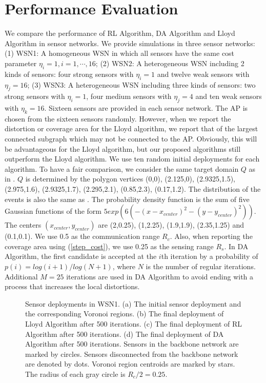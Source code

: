 \documentclass[journal,draftcls,onecolumn,12pt,twoside, narroweqnarray]{IEEEtran}
\begin{document}
\section{Performance Evaluation}
We compare the performance of RL Algorithm, DA Algorithm and Lloyd Algorithm in sensor networks. We provide simulations in three sensor networks: (1) WSN1: A homogeneous WSN in which all sensors have the same cost parameter $\eta_i=1, i=1,\cdots,16$; (2) WSN2: A heterogeneous WSN including 2 kinds of sensors: four strong sensors with $\eta_i=1$ and twelve weak sensors with $\eta_j=16$; (3) WSN3: A heterogeneous WSN including three kinds of sensors: two strong sensors with $\eta_i=1$, four medium sensors with $\eta_j=4$ and ten weak sensors with $\eta_k=16$. Sixteen sensors are provided in each sensor network.  The AP is chosen from the sixteen sensors randomly. However, when we report the distortion or coverage area for the Lloyd algorithm, we report that of the largest connected subgraph which may not be connected to the AP. Obviously, this will be advantageous for the Lloyd algorithm, but our proposed algorithms still outperform the Lloyd algorithm. We use ten random initial deployments for each algorithm. To have a fair comparison, we consider the same target domain $Q$ as in \cite{SD}. $Q$ is determined by the polygon vertices
{(0,0), (2.125,0), (2.9325,1.5), (2.975,1.6), (2.9325,1.7), (2.295,2.1), (0.85,2.3), (0.17,1.2)}. The distribution of the events is also the same as \cite{SD}. The probability density function is the sum of five Gaussian functions of the form $5exp(6(-(x-x_{center})^2-(y-y_{center})^2))$. The centers $(x_{center},y_{center})$ are (2,0.25), (1,2.25), (1.9,1.9), (2.35,1.25) and (0.1,0.1). We use 0.5 as the communication range $R_c$. Also, when reporting the coverage area using (\ref{step_cost}), we use 0.25 as the sensing range $R_s$. In DA Algorithm, the first candidate is accepted at the $i$th iteration by a probability of $p(i)=log(i+1)/log(N+1)$, where $N$ is the number of regular iterations. Additional $M=25$ iterations are used in DA Algorithm to avoid ending with a process that increases the local distortions.
\begin{figure*}[!t]
\centering
{}
\hfil
{}
\hfil
{}
\hfil
{}
\caption{Sensor deployments in WSN1. (a) The initial sensor deployment and the corresponding Voronoi regions. (b) The final deployment of Lloyd Algorithm after 500 iterations. (c) The final deployment of RL Algorithm after 500 iterations. (d) The final deployment of DA Algorithm after 500 iterations. Sensors in the backbone network are marked by circles. Sensors disconnected from the backbone network are denoted by dots. Voronoi region centroids are marked by stars. The radius of each gray circle is $R_c/2=0.25$.}
\label{Deployment In WSN1}
\end{figure*}
\end{document}
